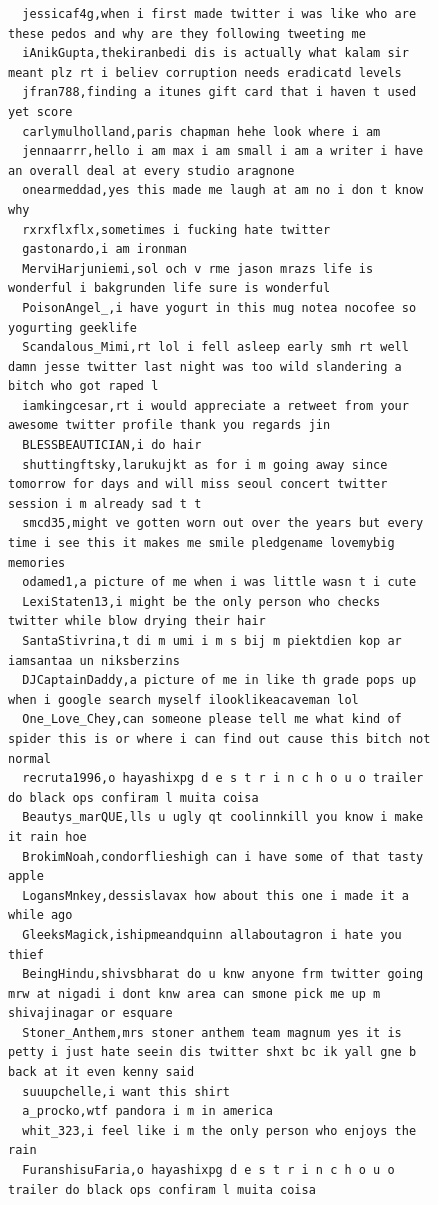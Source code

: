 \begin{figure}[htpb]
\begin{verbatim}
  jessicaf4g,when i first made twitter i was like who are these pedos and why are they following tweeting me
  iAnikGupta,thekiranbedi dis is actually what kalam sir meant plz rt i believ corruption needs eradicatd levels
  jfran788,finding a itunes gift card that i haven t used yet score
  carlymulholland,paris chapman hehe look where i am
  jennaarrr,hello i am max i am small i am a writer i have an overall deal at every studio aragnone
  onearmeddad,yes this made me laugh at am no i don t know why
  rxrxflxflx,sometimes i fucking hate twitter
  gastonardo,i am ironman
  MerviHarjuniemi,sol och v rme jason mrazs life is wonderful i bakgrunden life sure is wonderful
  PoisonAngel_,i have yogurt in this mug notea nocofee so yogurting geeklife
  Scandalous_Mimi,rt lol i fell asleep early smh rt well damn jesse twitter last night was too wild slandering a bitch who got raped l
  iamkingcesar,rt i would appreciate a retweet from your awesome twitter profile thank you regards jin
  BLESSBEAUTICIAN,i do hair
  shuttingftsky,larukujkt as for i m going away since tomorrow for days and will miss seoul concert twitter session i m already sad t t
  smcd35,might ve gotten worn out over the years but every time i see this it makes me smile pledgename lovemybig memories
  odamed1,a picture of me when i was little wasn t i cute
  LexiStaten13,i might be the only person who checks twitter while blow drying their hair
  SantaStivrina,t di m umi i m s bij m piektdien kop ar iamsantaa un niksberzins
  DJCaptainDaddy,a picture of me in like th grade pops up when i google search myself ilooklikeacaveman lol
  One_Love_Chey,can someone please tell me what kind of spider this is or where i can find out cause this bitch not normal
  recruta1996,o hayashixpg d e s t r i n c h o u o trailer do black ops confiram l muita coisa
  Beautys_marQUE,lls u ugly qt coolinnkill you know i make it rain hoe
  BrokimNoah,condorflieshigh can i have some of that tasty apple
  LogansMnkey,dessislavax how about this one i made it a while ago
  GleeksMagick,ishipmeandquinn allaboutagron i hate you thief
  BeingHindu,shivsbharat do u knw anyone frm twitter going mrw at nigadi i dont knw area can smone pick me up m shivajinagar or esquare
  Stoner_Anthem,mrs stoner anthem team magnum yes it is petty i just hate seein dis twitter shxt bc ik yall gne b back at it even kenny said
  suuupchelle,i want this shirt
  a_procko,wtf pandora i m in america
  whit_323,i feel like i m the only person who enjoys the rain
  FuranshisuFaria,o hayashixpg d e s t r i n c h o u o trailer do black ops confiram l muita coisa

\end{verbatim}
\end{figure}
